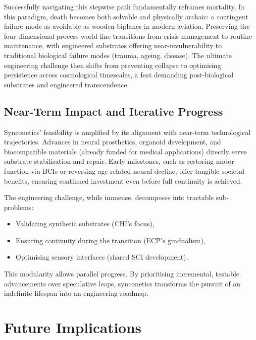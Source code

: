 \documentclass[10pt]{article}
\begin{document}
\begin{sloppypar}
  Successfully navigating this stepwise path fundamentally reframes mortality. In this paradigm, death becomes both solvable and physically archaic: a contingent failure mode as avoidable as wooden biplanes in modern aviation. Preserving the four-dimensional process-world-line transitions from crisis management to routine maintenance, with engineered substrates offering near-invulnerability to traditional biological failure modes (trauma, ageing, disease). The ultimate engineering challenge then shifts from preventing collapse to optimising persistence across cosmological timescales, a feat demanding post-biological substrates and engineered transcendence.

  \subsection{Near-Term Impact and Iterative Progress}
  \label{sec:near-term-impact}

  Synconetics’ feasibility is amplified by its alignment with near-term technological trajectories. Advances in neural prosthetics, organoid development, and biocompatible materials (already funded for medical applications) directly serve substrate stabilisation and repair. Early milestones, such as restoring motor function via BCIs or reversing age-related neural decline, offer tangible societal benefits, ensuring continued investment even before full continuity is achieved.

  The engineering challenge, while immense, decomposes into tractable sub-problems:
  \begin{itemize}
    \item Validating synthetic substrates (CHI’s focus),
    \item Ensuring continuity during the transition (ECP’s gradualism),
    \item Optimising sensory interfaces (shared SCI development).
  \end{itemize}

  This modularity allows parallel progress. By prioritising incremental, testable advancements over speculative leaps, synconetics transforms the pursuit of an indefinite lifespan into an engineering roadmap.


  \section{Future Implications}
  \label{sec:implications}


\end{sloppypar}
\end{document}
